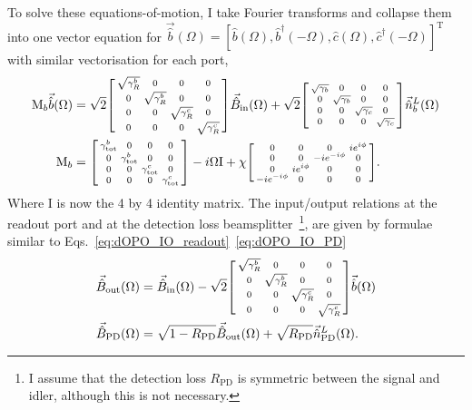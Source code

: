 To solve these equations-of-motion, I take Fourier transforms and collapse them into one vector equation for $\vec{\hat b}(\Omega)=[\hat b(\Omega), \hat b^\dag(-\Omega), \hat c(\Omega), \hat c^\dag(-\Omega)]^\text{T}$ with similar vectorisation for each port,
\begin{align}
\text{M}_b\vec{\hat b}(\Omega)&=\sqrt{2}\begin{bsmallmatrix}
\sqrt{\gamma^b_R} & 0 & 0 & 0 \\
0 & \sqrt{\gamma^b_R} & 0 & 0 \\
0 & 0 & \sqrt{\gamma^c_R} & 0 \\
0 & 0 & 0 & \sqrt{\gamma^c_R}
\end{bsmallmatrix}\vec{\hat B}_\mathrm{in}(\Omega) + \sqrt{2}\begin{bsmallmatrix}
\sqrt{\gamma_b} & 0 & 0 & 0 \\
0 & \sqrt{\gamma_b} & 0 & 0 \\
0 & 0 & \sqrt{\gamma_c} & 0 \\
0 & 0 & 0 & \sqrt{\gamma_c}
\end{bsmallmatrix}\vec{\hat n}^L_b(\Omega)\\
\text{M}_b&=\begin{bsmallmatrix}
\gamma^b_\mathrm{tot} & 0 & 0 & 0 \\
0 & \gamma^b_\mathrm{tot} & 0 & 0 \\
0 & 0 & \gamma^c_\mathrm{tot} & 0 \\
0 & 0 & 0 & \gamma^c_\mathrm{tot} 
\end{bsmallmatrix}-i\Omega \text{I}+\chi \begin{bsmallmatrix}
0 & 0 & 0 & i e^{i\phi} \\
0 & 0 & -i e^{-i\phi} & 0 \\
0 & i e^{i\phi} & 0 & 0 \\
-i e^{-i\phi} & 0 & 0 & 0
\end{bsmallmatrix}.
\end{align}
Where $\text{I}$ is now the 4 by 4 identity matrix. The input/output relations at the readout port and at the detection loss beamsplitter~\footnote{I assume that the detection loss $R_\text{PD}$ is symmetric between the signal and idler, although this is not necessary.}, are given by formulae similar to Eqs.~\ref{eq:dOPO_IO_readout}~\ref{eq:dOPO_IO_PD}
\begin{align}
\label{eq:nOPO_IO_relations}
\vec{\hat{B}}_\mathrm{out}(\Omega)&=\vec{\hat{B}}_\mathrm{in}(\Omega)-\sqrt{2}\begin{bsmallmatrix}
\sqrt{\gamma^b_R} & 0 & 0 & 0 \\
0 & \sqrt{\gamma^b_R} & 0 & 0 \\
0 & 0 & \sqrt{\gamma^c_R} & 0 \\
0 & 0 & 0 & \sqrt{\gamma^c_R}
\end{bsmallmatrix}\vec{\hat b}(\Omega)\\
\vec{\hat{B}}_\mathrm{PD}(\Omega)&=\sqrt{1-R_\text{PD}}\vec{\hat{B}}_\mathrm{out}(\Omega)+\sqrt{R_\text{PD}}\vec{\hat n}^L_\text{PD}(\Omega).
\end{align}
